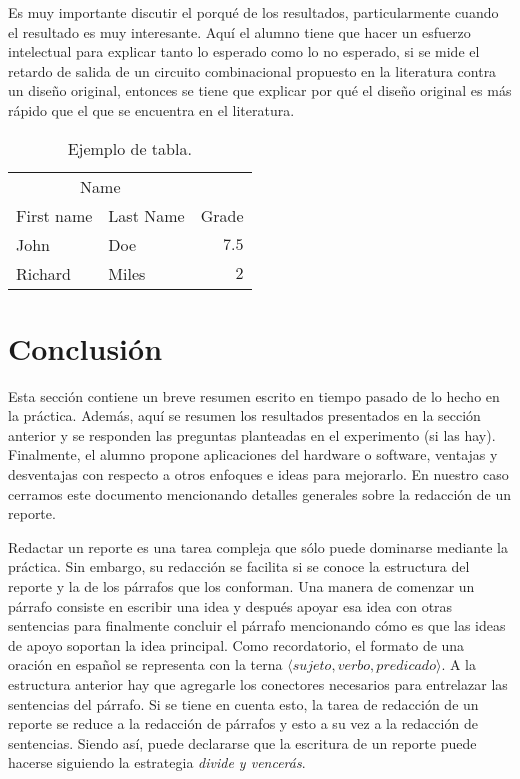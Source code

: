 \documentclass[12pt]{article}
\begin{document}
Es muy importante discutir el porqué de los resultados, particularmente cuando 
el resultado es muy interesante. Aquí el alumno tiene que hacer un esfuerzo 
intelectual para explicar tanto lo esperado como lo no esperado, \eg si se 
mide el retardo de salida de un circuito combinacional propuesto en la 
literatura contra un diseño original, entonces se tiene que explicar por qué el 
diseño original es más rápido que el que se encuentra en el literatura.

\begin{table}
  \centering
  \caption{Ejemplo de tabla.}
  \begin{tabular}{llr}
    \toprule
    \multicolumn{2}{c}{Name} \\
    \cmidrule(r){1-2} First name & Last Name & Grade \\ 
    \midrule John & Doe & $7.5$ \\
    Richard & Miles & $2$ \\
    \bottomrule
  \end{tabular}
  \label{tab:example}
\end{table}

\section{Conclusión}\label{sec:conclusion}

Esta sección contiene un breve resumen escrito en tiempo pasado de lo hecho en 
la práctica. Además, aquí se resumen los resultados presentados en la sección 
anterior y se responden las preguntas planteadas en el experimento 
(si las hay). Finalmente, el alumno propone aplicaciones del hardware o 
software, ventajas y desventajas con respecto a otros enfoques e ideas para 
mejorarlo. En nuestro caso cerramos este documento mencionando detalles 
generales sobre la redacción de un reporte.

Redactar un reporte es una tarea compleja que sólo puede dominarse mediante la 
práctica. Sin embargo, su redacción se facilita si se conoce la estructura del 
reporte y la de los párrafos que los conforman. Una manera de comenzar un 
párrafo consiste en escribir una idea y después apoyar esa idea con otras 
sentencias para finalmente concluir el párrafo mencionando cómo es que las 
ideas de apoyo soportan la idea principal. Como recordatorio, el formato de 
una oración en español se representa con la terna 
$\langle sujeto,verbo,predicado \rangle$. A la estructura anterior hay que 
agregarle los conectores necesarios para entrelazar las sentencias del párrafo. 
Si se tiene en cuenta esto, la tarea de redacción de un reporte se reduce a la 
redacción de párrafos y esto a su vez a la redacción de sentencias. Siendo así, 
puede declararse que la escritura de un reporte puede hacerse siguiendo la 
estrategia \textit{divide y vencerás}.
\end{document}

